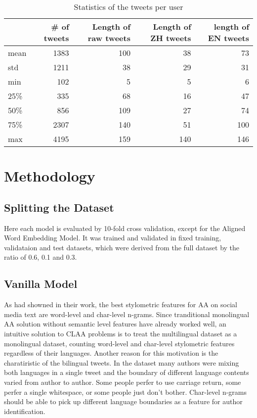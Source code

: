 \documentclass[11pt,a4paper]{article}
\begin{document}
\begin{table*}[t]
  \begin{center}
  \begin{tabular}{|l|r|r|r|r|}
  \hline & \bf \# of tweets & \bf Length of raw tweets & \bf Length of ZH tweets & \bf length of EN tweets \\ \hline
  mean & 1383 & 100 & 38 & 73 \\
  std & 1211 & 38 & 29 & 31  \\
  min & 102 & 5 & 5 & 6 \\
  25\% & 335 & 68 & 16 & 47 \\
  50\% & 856 & 109 & 27 & 74 \\
  75\% & 2307 & 140 & 51 & 100 \\
  max & 4195 & 159 & 140 & 146 \\
  \hline
  \end{tabular}
  \end{center}
  \caption{\label{tab:dist-dataset-table} Statistics of the tweets per user}
\end{table*}

\section{Methodology}\label{sec:method}

\subsection{Splitting the Dataset}

Here each model is evaluated by 10-fold cross validation, except for the Aligned Word Embedding Model. It was trained and validated in fixed training, validataion and test datasets, which were derived from the full dataset by the ratio of 0.6, 0.1 and 0.3.

\subsection{Vanilla Model}

As \citet{rocha2016authorship} had showned in their work, the best stylometric features for AA on social media text are word-level and char-level n-grams. Since tranditional monolingual AA solution without semantic level features have already worked well, an intuitive solution to CLAA problems is to treat the multilingual dataset as a monolingual dataset, counting word-level and char-level stylometric features regardless of their languages. Another reason for this motivation is the charatiristic of the bilingual tweets. In the dataset many authors were mixing both languages in a single tweet and the boundary of different language contents varied from author to author. Some people perfer to use carriage return, some perfer a single whitespace, or some people just don't bother. Char-level n-grams should be able to pick up different language boundaries as a feature for author identification.
\end{document}
